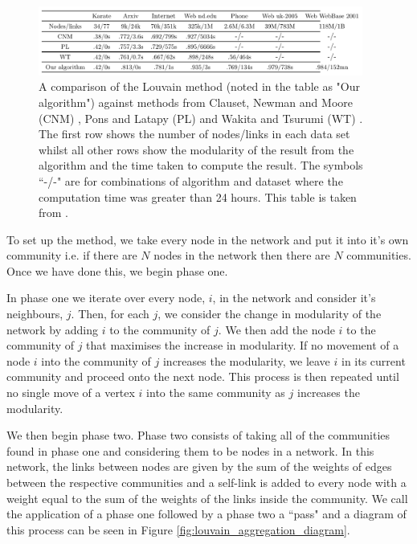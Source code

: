 \begin{figure}
    \begin{center}
        \includegraphics[width=0.95\textwidth]{img/3/comp}
    \end{center}
    \caption{A comparison of the Louvain method (noted in the table as "Our algorithm") against methods from Clauset, Newman and Moore (CNM) \cite{Clauset_2004}, Pons and Latapy (PL) \cite{JGAA-124} and Wakita and Tsurumi (WT) \cite{wakita_tsurumi}. The first row shows the number of nodes/links in each data set whilst all other rows show the modularity of the result from the algorithm and the time taken to compute the result. The symbols ``-/-" are for combinations of algorithm and dataset where the computation time was greater than 24 hours. This table is taken from \cite{Blondel_2008}.}
    \label{fig:louvain_results_comparison}
\end{figure}

\noindent
To set up the method, we take every node in the network and put it into it's own community i.e. if there are $N$ nodes in the network then there are $N$ communities. Once we have done this, we begin phase one. 

In phase one we iterate over every node, $i$, in the network and consider it's neighbours, $j$. Then, for each $j$, we consider the change in modularity of the network by adding $i$ to the community of $j$. We then add the node $i$ to the community of $j$ that maximises the increase in modularity. If no movement of a node $i$ into the community of $j$ increases the modularity, we leave $i$ in its current community and proceed onto the next node.  This process is then repeated until no single move of a vertex $i$ into the same community as $j$ increases the modularity.

We then begin phase two. Phase two consists of taking all of the communities found in phase one and considering them to be nodes in a network. In this network, the links between nodes are given by the sum of the weights of edges between the respective communities and a self-link is added to every node with a weight equal to the sum of the weights of the links inside the community. We call the application of a phase one followed by a phase two a ``pass" and a diagram of this process can be seen in Figure \ref{fig:louvain_aggregation_diagram}.

